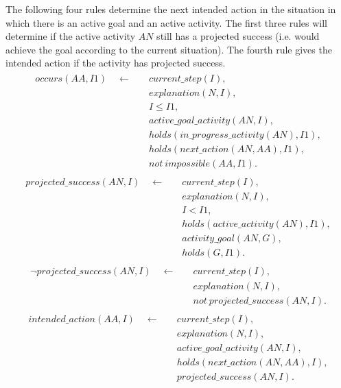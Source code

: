 \documentclass[11pt, oneside]{article}
\begin{document}
The following four rules determine the next intended action in the situation in which there is an active goal and an active activity. The first three rules will determine if the active activity $AN$ still has a projected success (i.e. would achieve the goal according to the current situation). The fourth rule gives the intended action if the activity has projected success.  
\begin{align}\begin{split}
occurs(AA,I1)\quad \leftarrow \quad &current\_step(I),\\
&explanation(N,I),\\
&I \leq I1,\\
&active\_goal\_activity(AN,I),\\
&holds(in\_progress\_activity(AN),I1),\\
&holds(next\_action(AN,AA),I1),\\
&not\ impossible(AA,I1).
\end{split}\end{align}
\begin{align}\begin{split}
projected\_success(AN,I) \quad \leftarrow \quad &current\_step(I),\\
&explanation(N,I),\\
&I < I1,\\     
&holds(active\_activity(AN),I1),\\
&activity\_goal(AN,G),\\            
 &holds(G,I1).
\end{split}\end{align}
\begin{align}\begin{split}
\neg projected\_success(AN,I) \quad \leftarrow \quad &current\_step(I),\\
&explanation(N,I),\\
&not\ projected\_success(AN,I).
\end{split}\end{align}
\begin{align}\begin{split}
intended\_action(AA,I)\quad \leftarrow \quad &current\_step(I),\\
&explanation(N,I),\\
&active\_goal\_activity(AN,I),\\
&holds(next\_action(AN,AA),I),\\
&projected\_success(AN,I).
\end{split}\end{align}
\end{document}
